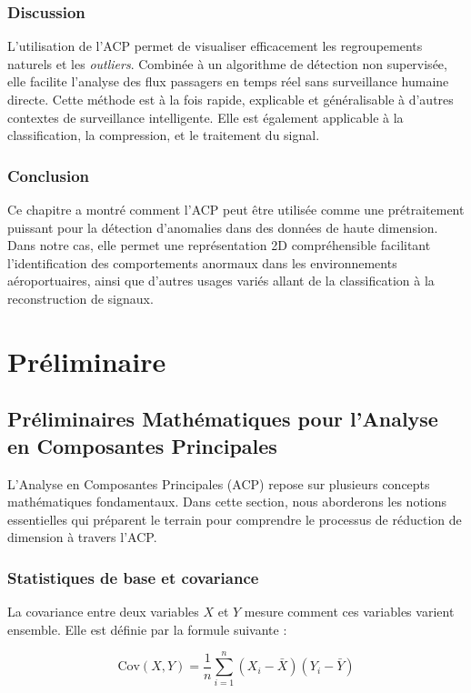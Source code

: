 \documentclass[a4paper,12pt]{report}
\begin{document}
\subsection{Discussion}
L'utilisation de l'ACP permet de visualiser efficacement les regroupements naturels et les \textit{outliers}. Combin\'ee \`a un algorithme de d\'etection non supervis\'ee, elle facilite l'analyse des flux passagers en temps r\'eel sans surveillance humaine directe. Cette m\'ethode est \`a la fois rapide, explicable et g\'en\'eralisable \`a d'autres contextes de surveillance intelligente. Elle est \'egalement applicable \`a la classification, la compression, et le traitement du signal.

\subsection{Conclusion}
Ce chapitre a montr\'e comment l'ACP peut \^etre utilis\'ee comme une pr\'etraitement puissant pour la d\'etection d'anomalies dans des donn\'ees de haute dimension. Dans notre cas, elle permet une repr\'esentation 2D compr\'ehensible facilitant l'identification des comportements anormaux dans les environnements a\'eroportuaires, ainsi que d'autres usages vari\'es allant de la classification \`a la reconstruction de signaux.

\newpage
\chapter{Préliminaire}
\section{Préliminaires Mathématiques pour l'Analyse en Composantes Principales}

L'Analyse en Composantes Principales (ACP) repose sur plusieurs concepts mathématiques fondamentaux. Dans cette section, nous aborderons les notions essentielles qui préparent le terrain pour comprendre le processus de réduction de dimension à travers l'ACP.

\subsection{Statistiques de base et covariance}

La covariance entre deux variables \( X \) et \( Y \) mesure comment ces variables varient ensemble. Elle est définie par la formule suivante :

\[
\text{Cov}(X, Y) = \frac{1}{n} \sum_{i=1}^n (X_i - \bar{X})(Y_i - \bar{Y})
\]
\end{document}
